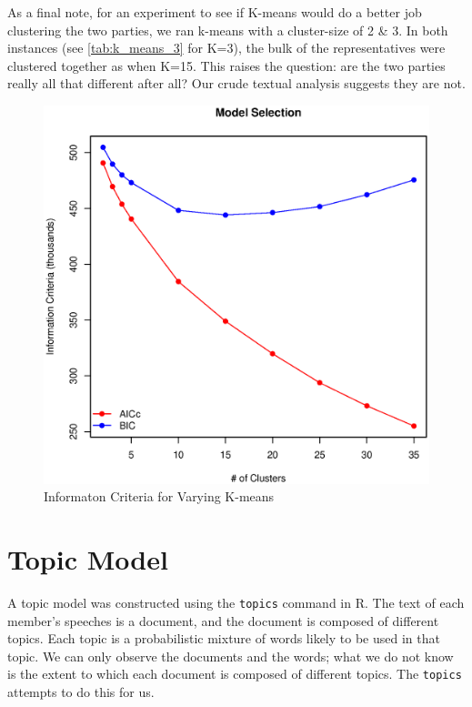 \documentclass[11pt, fleqn]{article}
\begin{document}


As a final note, for an experiment to see if K-means would do a better job clustering the two parties, we ran k-means with a cluster-size of 2 \& 3.  In both instances (see \vref{tab:k_means_3} for K=3), the bulk of the representatives were clustered together as when K=15.  This raises the question: are the two parties really all that different after all? Our crude textual analysis suggests they are not.

\begin{figure}[!htb]
  \centering
  \includegraphics[scale=.5]{kmeans_ic_plot.eps}
  \caption{Informaton Criteria for Varying K-means}
  \label{fig:kmeans_ic_plot}
\end{figure}



\section{Topic Model}

A topic model was constructed using the \texttt{topics} command in R. The text of each member's speeches is a document, and the document is composed of different topics. Each topic is a probabilistic mixture of words likely to be used in that topic. We can only observe the documents and the words; what we do not know is the extent to which each document is composed of different topics. The \texttt{topics} attempts to do this for us.
\end{document}
